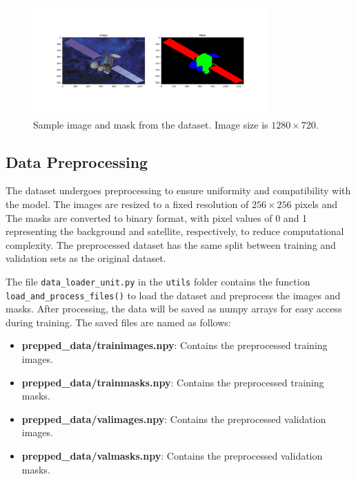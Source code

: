 \documentclass{article}
\begin{document}
\begin{figure}[h]
    \centering
    \includegraphics[width=0.8\textwidth]{../images/original_input_sample.png}
    \caption{Sample image and mask from the dataset. Image size is $1280 \times 720$.}
    \label{fig:original_dataset}
\end{figure}

\subsection{Data Preprocessing}

The dataset undergoes preprocessing to ensure uniformity and compatibility with the model. The images
are resized to a fixed resolution of $256 \times 256$ pixels and The masks are converted to binary format, with 
pixel values of 0 and 1 representing the background and satellite, respectively, to reduce computational
complexity. The preprocessed dataset has the same split between training and validation sets as the 
original dataset.
\vspace{1em}

The file \texttt{data\_loader\_unit.py} in the \texttt{utils} folder contains the function 
\texttt{load\_and\_process\_files()} to load the dataset and preprocess the images and masks. After processing, 
the data will be saved as numpy arrays for easy access during training. The saved files are named as follows:

\begin{itemize}
    \item \textbf{prepped\_data/trainimages.npy}: Contains the preprocessed training images.
    \item \textbf{prepped\_data/trainmasks.npy}: Contains the preprocessed training masks.
    \item \textbf{prepped\_data/valimages.npy}: Contains the preprocessed validation images.
    \item \textbf{prepped\_data/valmasks.npy}: Contains the preprocessed validation masks.
\end{itemize}
\vspace{1em}
\end{document}
